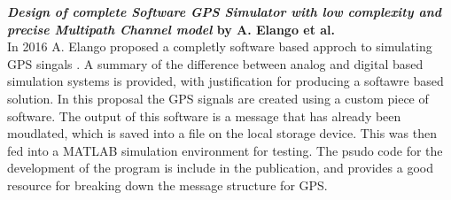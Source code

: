 \textbf{\emph{Design of complete Software GPS Simulator with low complexity and precise Multipath Channel model} by A. Elango et al.} \\ 
In 2016 A. Elango proposed a completly software based approch to simulating GPS singals \cite{RN15}. A summary of the difference between analog
and digital based simulation systems is provided, with justification for producing a softawre based solution. In this proposal the GPS signals are created
using a custom piece of software. The output of this software is a message that has already been moudlated, which is saved into a file on the local
storage device. This was then fed into a MATLAB simulation environment for testing. The psudo code for the development of the program is include in
the publication, and provides a good resource for breaking down the message structure for GPS.

\medskip



